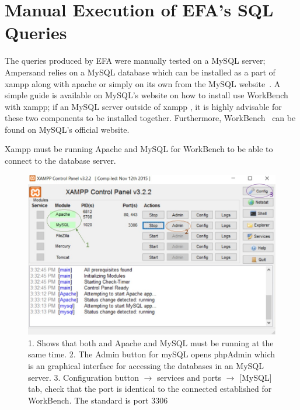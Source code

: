 
\section{Manual Execution of EFA's SQL Queries}

The queries produced by EFA were manually tested on a MySQL server; Ampersand 
relies on a MySQL database which can be installed as a part of xampp along with 
apache or simply on its own from the MySQL website~\cite{MySQL-web}. A simple guide is 
available on MySQL's website on how to install use WorkBench with xampp; if an 
MySQL server outside of xampp , it is highly advisable for these two components 
to be installed together. Furthermore, WorkBench~\cite{workbench} can be found on 
MySQL's official website.

Xampp must be running Apache and MySQL for WorkBench to be able to connect to 
the database server. 
\begin{figure}[!h]
    \includegraphics[width=\textwidth]{images/xampp}
    \caption{\footnotesize{1. Shows that both and Apache and MySQL must be 
    running at the same time. 2. The Admin button for mySQL opens phpAdmin 
    which is an graphical interface for accessing the databases in an MySQL 
    server. 3. Configuration button $\rightarrow$ services and ports 
    $\rightarrow$ [MySQL] tab, check that the port is identical to the 
    connected established for WorkBench. The standard is port 3306 }}
\end{figure}

